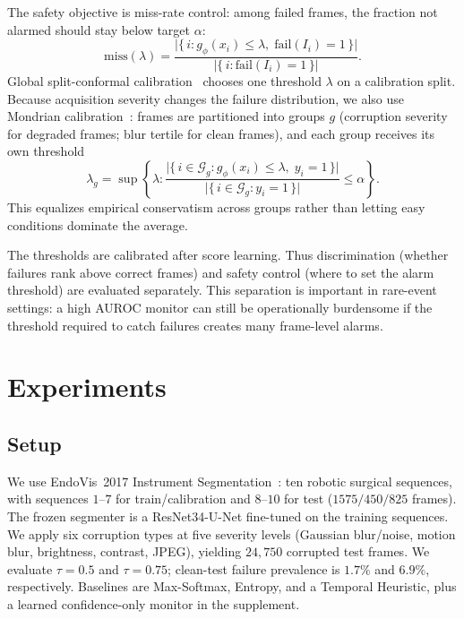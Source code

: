 \documentclass[runningheads]{llncs}
\newcommand{\unet}{U-Net}
\begin{document}
The safety objective is miss-rate control: among failed frames, the fraction
not alarmed should stay below target $\alpha$:
\begin{equation}
\mathrm{miss}(\lambda)=
\frac{\bigl|\{\, i : g_\phi(x_i) \le \lambda,\; \mathrm{fail}(I_i)=1\,\}\bigr|}
     {\bigl|\{\, i : \mathrm{fail}(I_i)=1 \,\}\bigr|}.
\end{equation}
Global split-conformal calibration~\cite{ref:vovk} chooses one threshold
$\lambda$ on a calibration split. Because acquisition severity changes the
failure distribution, we also use Mondrian calibration~\cite{ref:mondrian}:
frames are partitioned into groups $g$ (corruption severity for degraded
frames; blur tertile for clean frames), and each group receives its own
threshold
\begin{equation}
\lambda_g = \sup\!\left\{ \lambda :
\frac{\bigl|\{\, i \in \mathcal{G}_g : g_\phi(x_i) \le \lambda,\; y_i = 1 \,\}\bigr|}
     {\bigl|\{\, i \in \mathcal{G}_g : y_i = 1 \,\}\bigr|} \le \alpha \right\}.
\end{equation}
This equalizes empirical conservatism across groups rather than letting easy
conditions dominate the average.

The thresholds are calibrated after score learning. Thus discrimination
(whether failures rank above correct frames) and safety control (where to set
the alarm threshold) are evaluated separately. This separation is important in
rare-event settings: a high AUROC monitor can still be operationally burdensome
if the threshold required to catch failures creates many frame-level alarms.

\section{Experiments}

\subsection{Setup}

We use EndoVis~2017 Instrument Segmentation~\cite{ref:bodenstedt}: ten robotic
surgical sequences, with sequences $1$--$7$ for train/calibration and
$8$--$10$ for test ($1575/450/825$ frames). The frozen segmenter is a
ResNet34-\unet{} fine-tuned on the training sequences. We apply six corruption
types at five severity levels (Gaussian blur/noise, motion blur, brightness,
contrast, JPEG), yielding $24{,}750$ corrupted test frames. We evaluate
$\tau=0.5$ and $\tau=0.75$; clean-test failure prevalence is $1.7\%$ and
$6.9\%$, respectively. Baselines are Max-Softmax, Entropy, and a Temporal
Heuristic, plus a learned confidence-only monitor in the supplement.
\end{document}
